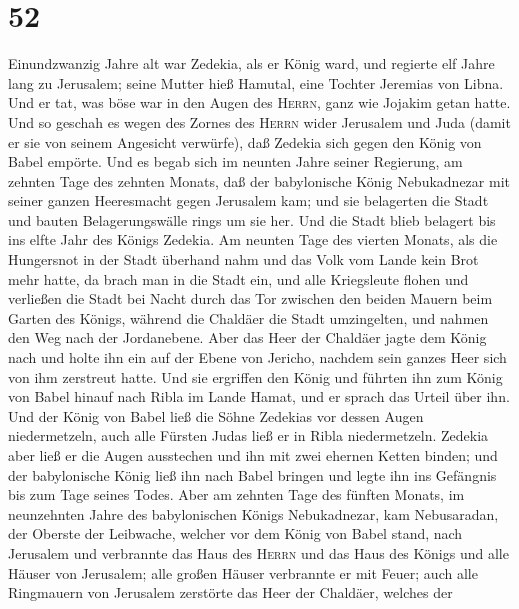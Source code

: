 \hypertarget{section-51}{%
\section{52}\label{section-51}}

 Einundzwanzig Jahre alt war Zedekia, als er König ward,
und regierte elf Jahre lang zu Jerusalem; seine Mutter hieß Hamutal,
eine Tochter Jeremias von Libna.  Und er tat, was böse war
in den Augen des \textsc{Herrn}, ganz wie Jojakim getan hatte.
 Und so geschah es wegen des Zornes des \textsc{Herrn}
wider Jerusalem und Juda (damit er sie von seinem Angesicht verwürfe),
daß Zedekia sich gegen den König von Babel empörte.  Und
es begab sich im neunten Jahre seiner Regierung, am zehnten Tage des
zehnten Monats, daß der babylonische König Nebukadnezar mit seiner
ganzen Heeresmacht gegen Jerusalem kam; und sie belagerten die Stadt und
bauten Belagerungswälle rings um sie her.  Und die Stadt
blieb belagert bis ins elfte Jahr des Königs Zedekia.  Am
neunten Tage des vierten Monats, als die Hungersnot in der Stadt
überhand nahm und das Volk vom Lande kein Brot mehr hatte,
 da brach man in die Stadt ein, und alle Kriegsleute
flohen und verließen die Stadt bei Nacht durch das Tor zwischen den
beiden Mauern beim Garten des Königs, während die Chaldäer die Stadt
umzingelten, und nahmen den Weg nach der Jordanebene. 
Aber das Heer der Chaldäer jagte dem König nach und holte ihn ein auf
der Ebene von Jericho, nachdem sein ganzes Heer sich von ihm zerstreut
hatte.  Und sie ergriffen den König und führten ihn zum
König von Babel hinauf nach Ribla im Lande Hamat, und er sprach das
Urteil über ihn.  Und der König von Babel ließ die Söhne
Zedekias vor dessen Augen niedermetzeln, auch alle Fürsten Judas ließ er
in Ribla niedermetzeln.  Zedekia aber ließ er die Augen
ausstechen und ihn mit zwei ehernen Ketten binden; und der babylonische
König ließ ihn nach Babel bringen und legte ihn ins Gefängnis bis zum
Tage seines Todes.  Aber am zehnten Tage des fünften
Monats, im neunzehnten Jahre des babylonischen Königs Nebukadnezar, kam
Nebusaradan, der Oberste der Leibwache, welcher vor dem König von Babel
stand,  nach Jerusalem und verbrannte das Haus des
\textsc{Herrn} und das Haus des Königs und alle Häuser von Jerusalem;
alle großen Häuser verbrannte er mit Feuer;  auch alle
Ringmauern von Jerusalem zerstörte das Heer der Chaldäer, welches der
